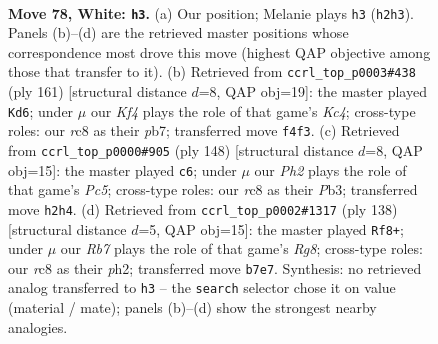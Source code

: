 \documentclass[11pt]{article}
\begin{document}
\clearpage

\begin{figure}[p]\centering
\begin{subfigure}{0.46\textwidth}\centering
\resizebox{\linewidth}{!}{%
\newchessgame
\chessboard[
  setfen={2r4k/1R6/8/8/5K2/8/3r3P/8 w - - 23 78},
  showmover=false,
  pgfstyle=straightmove, color=movearrow, markmove={h2-h3}
]}
\caption{}
\end{subfigure}\hfill
\begin{subfigure}{0.46\textwidth}\centering
\resizebox{\linewidth}{!}{%
\newchessgame
\chessboard[
  setfen={5r2/1P4R1/8/2k5/4K3/6p1/8/8 b - - 2 81},
  showmover=false,
  pgfstyle=straightmove, color=movearrow, markmove={c5-d6}
]}
\caption{}
\end{subfigure}
\\[4pt]
\begin{subfigure}{0.46\textwidth}\centering
\resizebox{\linewidth}{!}{%
\newchessgame
\chessboard[
  setfen={8/K5R1/5R2/2P4r/8/1P6/7k/8 w - - 1 75},
  showmover=false,
  pgfstyle=straightmove, color=movearrow, markmove={c5-c6}
]}
\caption{}
\end{subfigure}\hfill
\begin{subfigure}{0.46\textwidth}\centering
\resizebox{\linewidth}{!}{%
\newchessgame
\chessboard[
  setfen={6R1/1KP5/8/8/8/8/2r2k1p/8 w - - 11 70},
  showmover=false,
  pgfstyle=straightmove, color=movearrow, markmove={g8-f8}
]}
\caption{}
\end{subfigure}
\caption{\textbf{Move 78, White: \texttt{h3}.} (a) Our position; Melanie plays \texttt{h3} (\texttt{h2h3}). Panels (b)--(d) are the retrieved master positions whose correspondence most drove this move (highest QAP objective among those that transfer to it). (b) Retrieved from \texttt{ccrl\_top\_p0003\#438} (ply 161) [structural distance $d$=8, QAP obj=19]: the master played \texttt{Kd6}; under $\mu$ our \emph{Kf4} plays the role of that game's \emph{Kc4}; cross-type roles: our \emph{r}c8 as their \emph{p}b7; transferred move \texttt{f4f3}. (c) Retrieved from \texttt{ccrl\_top\_p0000\#905} (ply 148) [structural distance $d$=8, QAP obj=15]: the master played \texttt{c6}; under $\mu$ our \emph{Ph2} plays the role of that game's \emph{Pc5}; cross-type roles: our \emph{r}c8 as their \emph{P}b3; transferred move \texttt{h2h4}. (d) Retrieved from \texttt{ccrl\_top\_p0002\#1317} (ply 138) [structural distance $d$=5, QAP obj=15]: the master played \texttt{Rf8+}; under $\mu$ our \emph{Rb7} plays the role of that game's \emph{Rg8}; cross-type roles: our \emph{r}c8 as their \emph{p}h2; transferred move \texttt{b7e7}. Synthesis: no retrieved analog transferred to \texttt{h3} -- the \texttt{search} selector chose it on value (material / mate); panels (b)--(d) show the strongest nearby analogies.}
\label{fig:thought-m154}
\end{figure}
\end{document}
